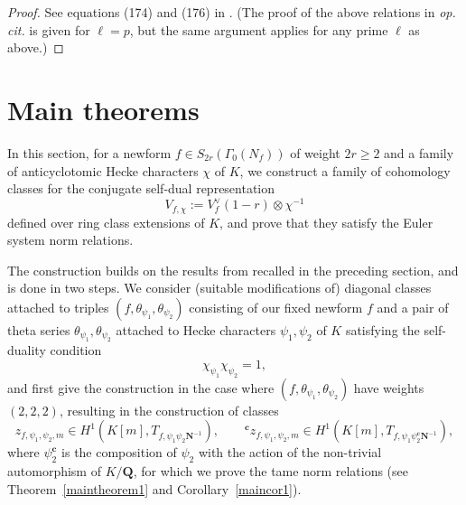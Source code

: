 \documentclass[10pt,letterpaper]{amsart}
\theoremstyle{plain}
\theoremstyle{definition}
\theoremstyle{definition}
\theoremstyle{plain}
\newtheorem{prop}[thm]{Proposition}
\theoremstyle{plain}
\theoremstyle{plain}
\theoremstyle{remark}
\numberwithin{equation}{section}
\newcommand{\cc}{\mathbf{c}}
\newcommand{\Q}{\mathbf{Q}}
\begin{document}
\begin{proof}
See equations (174) and (176) in \cite{BSV}. (The proof of the above relations in \emph{op.\,cit.} is given for $\ell=p$, but the same argument applies for any prime $\ell$ as above.)
\end{proof}







\section{Main theorems}\label{sec:main-thms}


In this section, for a newform $f\in S_{2r}(\Gamma_0(N_f))$ of weight $2r\geq 2$ and a family of anticyclotomic Hecke characters $\chi$ of $K$, %
we construct a family of cohomology classes for %
the conjugate self-dual representation 
\[
V_{f,\chi}:=V_f^\vee(1-r)\otimes\chi^{-1}
\]
defined over ring class extensions of $K$, and prove that they  satisfy the Euler system norm relations. 

The construction builds on the results from \cite{BSV,LLZ-K} recalled in the preceding section, and is done in two steps. We consider (suitable modifications of) diagonal classes attached to triples $(f,\theta_{\psi_1},\theta_{\psi_2})$ consisting of our fixed newform $f$ and a pair of theta series $\theta_{\psi_1},\theta_{\psi_2}$ attached to Hecke characters $\psi_1,\psi_2$ of $K$ satisfying the self-duality condition
\[
\chi_{\psi_1}\chi_{\psi_2}=1,
\]
and first give the construction in the case where $(f,\theta_{\psi_1},\theta_{\psi_2})$ have weights $(2,2,2)$, resulting in the construction of classes 
\begin{equation}\label{eq:wt2-classes}
z_{f,\psi_1,\psi_2,m}\in H^1(K[m],T_{f,\psi_1\psi_2\mathbf{N}^{-1}}),\quad\quad
{}^{\cc}z_{f,\psi_1,\psi_2,m}\in H^1(K[m],T_{f,\psi_1\psi_2^\cc\mathbf{N}^{-1}}),\nonumber
\end{equation}
where $\psi_2^\cc$ is the composition of $\psi_2$ with the action of the non-trivial automorphism of $K/\Q$, for which we prove the tame norm relations (see Theorem~\ref{maintheorem1} and Corollary~\ref{maincor1}). 
\end{document}
